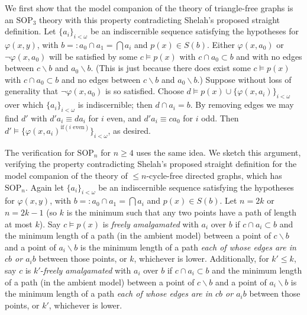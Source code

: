\documentclass{article}
\theoremstyle{definition}
\theoremstyle{definition}
\theoremstyle{definition}
\begin{document}
    We first show that the model companion of the theory of triangle-free graphs is an $\mathrm{SOP}_{3}$ theory with this property contradicting Shelah's proposed straight definition. Let $\{a_{i}\}_{i < \omega}$ be an indiscernible sequence satisfying the hypotheses for $\varphi(x, y)$, with $b =: a_{0} \cap a_{1} = \bigcap a_{i}$ and $p(x) \in S(b)$. Either $\varphi(x, a_{0})$ or $\neg\varphi(x, a_{0})$ will be satisfied by some $c \models p(x)$ with $c \cap a_{0} \subset b$ and with no edges between $c \backslash b$ and $a_{0} \backslash b$. (This is just because there does exist some $c \models p(x)$ with $c \cap a_{0} \subset b$ and no edges between $c \backslash b$ and $a_{0} \backslash b$.) Suppose without loss of generality that $\neg\varphi(x, a_{0})$ is so satisfied. Choose $d \models p(x) \cup \{\varphi(x, a_{i})\}_{ i < \omega}$ over which $\{a_{i}\}_{i< \omega}$ is indiscernible; then $d \cap a_{i} = b$. By removing edges we may find $d'$ with $d'a_{i} \equiv da_{i}$ for $i$ even, and $d'a_{i} \equiv c a_{0}$ for $i $ odd. Then $d' \models \{\varphi(x, a_{i})^{\text{if}(i \text{ even})} \}_{ i < \omega} $, as desired.


    The verification for $\mathrm{SOP}_{n}$ for $n \geq 4$ uses the same idea. We sketch this argument, verifying the property contradicting Shelah's proposed straight definition for the model companion of the theory of $\leq n$-cycle-free directed graphs, which has $\mathrm{SOP}_{n}$. Again let $\{a_{i}\}_{i < \omega}$ be an indiscernible sequence satisfying the hypotheses for $\varphi(x, y)$, with $b =: a_{0} \cap a_{1} = \bigcap a_{i}$ and $p(x) \in S(b)$. Let $n= 2k$ or $n = 2k-1$ (so $k$ is the minimum such that any two points have a path of length at most $k$). Say $c \models p(x)$ is \textit{freely amalgamated} with $a_{i}$ over $b$ if $c \cap a_{i} \subset b$ and the minimum length of a path (in the ambient model) between a point of $c \backslash b$ and a point of $a_{i} \backslash b$ is the minimum length of a path \textit{each of whose edges are in $cb$ or $a_{i}b$} between those points, or $k$, whichever is lower. Additionally, for $k' \leq k$, say $c$ is $k'$-\textit{freely amalgamated} with $a_{i}$ over $b$ if $c \cap a_{i} \subset b$ and the minimum length of a path (in the ambient model) between a point of $c \backslash b$ and a point of $a_{i} \backslash b$ is the minimum length of a path \textit{each of whose edges are in $cb$ or $a_{i}b$} between those points, or $k'$, whichever is lower.
    
\end{document}
